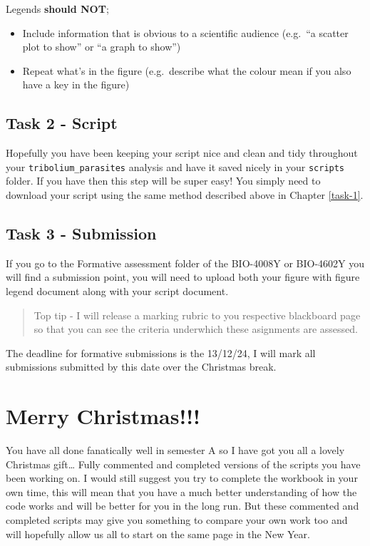 \documentclass[
]{book}
\providecommand{\tightlist}{%
  \setlength{\itemsep}{0pt}\setlength{\parskip}{0pt}}
\begin{document}
Legends \textbf{should NOT};

\begin{itemize}
\tightlist
\item
  Include information that is obvious to a scientific audience (e.g.~``a scatter plot to show'' or ``a graph to show'')
\item
  Repeat what's in the figure (e.g.~describe what the colour mean if you also have a key in the figure)
\end{itemize}

\section{Task 2 - Script}\label{task-2---script}

Hopefully you have been keeping your script nice and clean and tidy throughout your \texttt{tribolium\_parasites} analysis and have it saved nicely in your \texttt{scripts} folder. If you have then this step will be super easy! You simply need to download your script using the same method described above in Chapter \ref{task-1}.

\section{Task 3 - Submission}\label{task-3---submission}

If you go to the Formative assessment folder of the BIO-4008Y or BIO-4602Y you will find a submission point, you will need to upload both your figure with figure legend document along with your script document.

\begin{quote}
Top tip - I will release a marking rubric to you respective blackboard page so that you can see the criteria underwhich these asignments are assessed.
\end{quote}

The deadline for formative submissions is the 13/12/24, I will mark all submissions submitted by this date over the Christmas break.

\chapter{Merry Christmas!!!}\label{code}

You have all done fanatically well in semester A so I have got you all a lovely Christmas gift\ldots{} Fully commented and completed versions of the scripts you have been working on. I would still suggest you try to complete the workbook in your own time, this will mean that you have a much better understanding of how the code works and will be better for you in the long run. But these commented and completed scripts may give you something to compare your own work too and will hopefully allow us all to start on the same page in the New Year.
\end{document}
